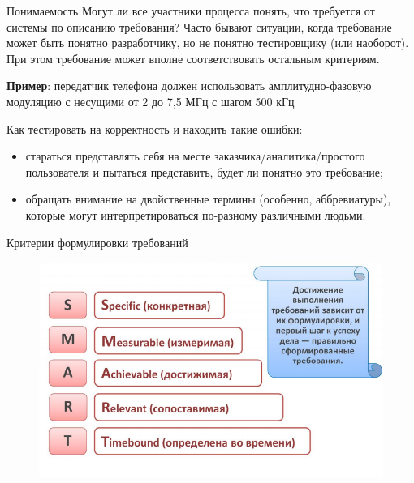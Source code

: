 \documentclass{beamer}
\begin{document}
\begin{frame}[t]{Понимаемость}
Могут ли все участники процесса понять, что требуется от системы по описанию
требования? Часто бывают ситуации, когда требование может быть понятно разработчику, но не
понятно тестировщику (или наоборот). При этом требование может вполне
соответствовать остальным критериям.

\textbf{Пример}: передатчик телефона должен использовать амплитудно-фазовую
модуляцию с несущими от 2 до 7,5 МГц с шагом 500 кГц

Как тестировать на корректность и находить такие ошибки:
\begin{itemize}
\item стараться представлять себя на месте заказчика/аналитика/простого
пользователя и пытаться представить, будет ли понятно это требование;
\item обращать внимание на двойственные термины (особенно, аббревиатуры),
которые могут интерпретироваться по-разному различными людьми. 
\end{itemize}
\end{frame}

\begin{frame}[t]{Критерии формулировки требований}
\begin{figure}[h]
\centering
\includegraphics[scale=0.5]{images/lec02-pic14.png}
\end{figure}
\end{frame}
\end{document}

